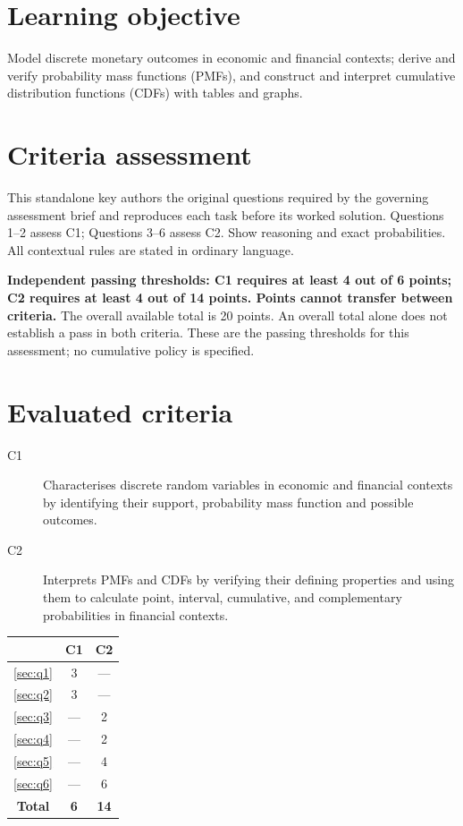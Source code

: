 \maketitle
\small
\setlength{\topsep}{3pt}
\setcounter{tocdepth}{1}
\label{toc}
\tableofcontents
\section*{Learning objective}
Model discrete monetary outcomes in economic and financial contexts; derive and verify probability mass functions (PMFs), and construct and interpret cumulative distribution functions (CDFs) with tables and graphs.
\section*{Criteria assessment}
This standalone key authors the original questions required by the governing assessment brief and reproduces each task before its worked solution. Questions 1--2 assess C1; Questions 3--6 assess C2. Show reasoning and exact probabilities. All contextual rules are stated in ordinary language.

\textbf{Independent passing thresholds: C1 requires at least 4 out of 6 points; C2 requires at least 4 out of 14 points. Points cannot transfer between criteria.} The overall available total is 20 points. An overall total alone does not establish a pass in both criteria. These are the passing thresholds for this assessment; no cumulative policy is specified.
\section*{Evaluated criteria}
\begin{description}
\item[C1] Characterises discrete random variables in economic and financial contexts by identifying their support, probability mass function and possible outcomes.
\item[C2] Interprets PMFs and CDFs by verifying their defining properties and using them to calculate point, interval, cumulative, and complementary probabilities in financial contexts.
\end{description}

\begin{center}
\begin{tabular}{|c|c|c|}
	\hline\textbf{\textnumero} & \textbf{C1} & \textbf{C2} \\ \hline
	\ref*{sec:q1} & 3 & --- \\\hline
	\ref*{sec:q2} & 3 & --- \\\hline
	\ref*{sec:q3} & --- & 2 \\\hline
	\ref*{sec:q4} & --- & 2 \\\hline
	\ref*{sec:q5} & --- & 4 \\\hline
	\ref*{sec:q6} & --- & 6 \\\hline
	\textbf{Total} & \textbf{6} & \textbf{14} \\\hline
\end{tabular}
\end{center}

